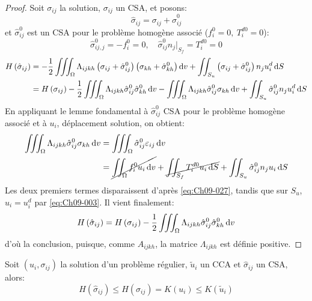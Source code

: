 \begin{proof}
    Soit $\sigma_{ij}$ la solution, $\sigma_{ij}$ un CSA, et posons:
    \begin{equation}
        \hat{\sigma}_{ij} = \sigma_{ij} + \hat{\sigma}_{ij}^0
        \label{eq:Ch09-026}
    \end{equation}
    et $\hat{\sigma}_{ij}^0$ est un CSA pour le problème homogène associé ($f_i^0 = 0,\ T_i^{d0} = 0$):
    \begin{equation}
        \hat{\sigma}_{ij,j}^0 = -f_i^0 = 0,\quad \hat{\sigma}_{ij}^0 n_j |_{S_f} = T_i^{d0} = 0
        \label{eq:Ch09-027}
    \end{equation}
    \begin{align*}
        H\left( \hat{\sigma}_{ij} \right) &= - \frac{1}{2} \iiint_{\Omega} \Lambda_{ijkh} \left( \sigma_{ij} + \hat{\sigma}_{ij}^0 \right) \left( \sigma_{kh} + \hat{\sigma}_{kh}^0 \right) \mathop{\mathrm{{}d}}\mathopen{} v + \iint_{S_u} \left( \sigma_{ij} + \hat{\sigma}_{ij}^0 \right) n_j u_i^d \mathop{\mathrm{{}d}}\mathopen{} S \\
        &= H\left( \sigma_{ij} \right) - \frac{1}{2} \iiint_{\Omega} \Lambda_{ijkh} \hat{\sigma}_{ij}^0 \hat{\sigma}_{kh}^0 \mathop{\mathrm{{}d}}\mathopen{} v - \iiint_{\Omega} \Lambda_{ijkh} \hat{\sigma}_{ij}^0 \sigma_{kh} \mathop{\mathrm{{}d}}\mathopen{} v + \iint_{S_u} \hat{\sigma}^0_{ij} n_j u_i^d \mathop{\mathrm{{}d}}\mathopen{} S
    \end{align*}
    En appliquant le lemme fondamental à $\hat{\sigma}_{ij}^0$ CSA pour le problème homogène associé et à $u_i$, déplacement solution, on obtient:
    \begin{align*}
        \iiint_{\Omega} \Lambda_{ijkh} \hat{\sigma}_{ij}^0 \sigma_{kh} \mathop{\mathrm{{}d}}\mathopen{} v &= \iiint_{\Omega} \hat{\sigma}_{ij}^0 \varepsilon_{ij} \mathop{\mathrm{{}d}}\mathopen{} v \\
        &= \cancel{\iint_{\Omega} f_i^0 u_i \mathop{\mathrm{{}d}}\mathopen{} v} + \cancel{\iint_{S_f} T_i^{d0} u_i \mathop{\mathrm{{}d}}\mathopen{} S} + \iint_{S_u} \hat{\sigma}_{ij}^0 n_j u_i \mathop{\mathrm{{}d}}\mathopen{} S
    \end{align*}
    Les deux premiers termes disparaissent d'après \eqref{eq:Ch09-027}, tandis que sur $S_u$, $u_i=u_i^d$ par \eqref{eq:Ch09-003}.
    Il vient finalement: 
    \begin{equation}
        H \left( \hat{\sigma}_{ij} \right) = H \left( \sigma_{ij} \right) - \frac{1}{2} \iiint_{\Omega} \Lambda_{ijkh} \hat{\sigma}_{ij}^0 \hat{\sigma}_{kh}^0 \mathop{\mathrm{{}d}}\mathopen{} v
        \label{eq:Ch09-028}
    \end{equation}
    d'où la conclusion, puisque, comme $A_{ijkh}$, la matrice $\Lambda_{ijkh}$ est définie positive.
\end{proof}
\begin{thm}
    Soit $\left( u_i, \sigma_{ij} \right)$ la solution d'un problème régulier, $\tilde{u}_i$ un CCA et $\hat{\sigma}_{ij}$ un CSA, alors:
    \begin{equation}
        H \left( \hat{\sigma}_{ij} \right) \leq H \left( \sigma_{ij} \right) = K \left( u_i \right) \leq K \left( \tilde{u}_i \right)
        \label{eq:Ch09-029}
    \end{equation}
\end{thm}


